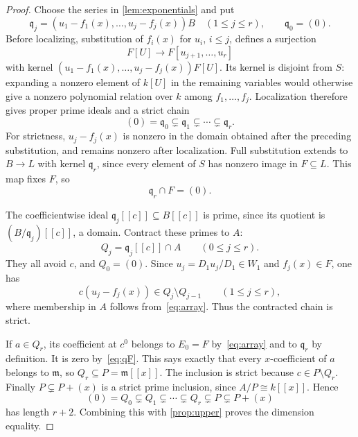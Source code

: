 \documentclass[10pt,a4paper]{amsart}
\newcommand{\m}{\mathfrak m}
\newcommand{\q}{\mathfrak q}
\begin{document}
\begin{proof}
Choose the series in \cref{lem:exponentials} and put
\[
 \q_j=(u_1-f_1(x),\ldots,u_j-f_j(x))B\quad(1\le j\le r),
 \qquad\q_0=(0).
\]
Before localizing, substitution of $f_i(x)$ for $u_i$, $i\le j$,
defines a surjection
\[
 F[U]\longrightarrow F[u_{j+1},\ldots,u_r]
\]
with kernel $(u_1-f_1(x),\ldots,u_j-f_j(x))F[U]$.
Its kernel is disjoint from $S$: expanding a nonzero element of
$k[U]$ in the remaining variables would otherwise give a nonzero
polynomial relation over $k$ among $f_1,\ldots,f_j$.
Localization therefore gives proper prime ideals and a strict chain
\begin{equation}\label{eq:qchain}
 (0)=\q_0\subsetneq\q_1\subsetneq\cdots\subsetneq\q_r.
\end{equation}
For strictness, $u_j-f_j(x)$ is nonzero in the domain obtained
after the preceding substitution, and remains nonzero after
localization. Full substitution extends to $B\longrightarrow L$
with kernel $\q_r$, since every element of $S$ has nonzero image
in $F\subseteq L$. This map fixes $F$, so
\begin{equation}\label{eq:qF}
 \q_r\cap F=(0).
\end{equation}

The coefficientwise ideal $\q_j[[c]]\subseteq B[[c]]$ is prime,
since its quotient is $(B/\q_j)[[c]]$, a domain.
Contract these primes to $A$:
\[
 Q_j=\q_j[[c]]\cap A\qquad(0\le j\le r).
\]
They all avoid $c$, and $Q_0=(0)$.
Since $u_j=D_1u_j/D_1\in W_1$ and $f_j(x)\in F$, one has
\[
 c(u_j-f_j(x))\in Q_j\setminus Q_{j-1}
 \qquad(1\le j\le r),
\]
where membership in $A$ follows from~\eqref{eq:array}.
Thus the contracted chain is strict.

If $a\in Q_r$, its coefficient at $c^0$ belongs to $E_0=F$
by~\eqref{eq:array} and to $\q_r$ by definition. It is zero
by~\eqref{eq:qF}. This says exactly that every $x$-coefficient
of $a$ belongs to $\m$, so $Q_r\subseteq P=\m[[x]]$.
The inclusion is strict because $c\in P\setminus Q_r$.
Finally $P\subsetneq P+(x)$ is a strict prime inclusion, since
$A/P\cong k[[x]]$. Hence
\begin{equation}\label{eq:final-chain}
 (0)=Q_0\subsetneq Q_1\subsetneq\cdots\subsetneq Q_r
       \subsetneq P\subsetneq P+(x)
\end{equation}
has length $r+2$. Combining this with \cref{prop:upper} proves
the dimension equality.
\end{proof}
\end{document}
